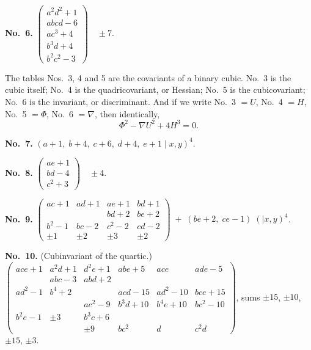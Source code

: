\documentclass[11pt]{article}
\begin{document}
\medskip
\noindent\textbf{No.~6.} \quad
$\begin{pmatrix}
a^2 d^2 + 1 \\
abcd - 6 \\
ac^3 + 4 \\
b^3 d + 4 \\
b^2 c^2 - 3
\end{pmatrix}\quad \pm 7$.

\medskip
The tables Nos.~3, 4 and 5 are the covariants of a binary cubic. No.~3 is the cubic itself; No.~4 is the quadricovariant, or Hessian; No.~5 is the cubicovariant; No.~6 is the invariant, or discriminant. And if we write No.~3 $=U$, No.~4 $=H$, No.~5 $=\Phi$, No.~6 $=\nabla$, then identically,
\[
\Phi^2 - \nabla U^2 + 4 H^3 = 0.
\]

\medskip
\noindent\textbf{No.~7.} \quad $(a+1,\; b+4,\; c+6,\; d+4,\; e+1 \mid x, y)^4$.

\medskip
\noindent\textbf{No.~8.} \quad
$\begin{pmatrix} ae + 1 \\ bd - 4 \\ c^2 + 3 \end{pmatrix}\quad \pm 4$.

\medskip
\noindent\textbf{No.~9.} \quad
$\left(\begin{array}{cccc}
ac + 1 & ad + 1 & ae + 1 & bd + 1 \\
       &        & bd + 2 & be + 2 \\
b^2 - 1 & bc - 2 & c^2 - 2 & cd - 2 \\
\pm 1   & \pm 2  & \pm 3   & \pm 2
\end{array}\right)\;+\;(be + 2,\; ce - 1)\;(\mid x, y)^4$.

\medskip
\noindent\textbf{No.~10.} \quad (Cubinvariant of the quartic.)
$\left(\begin{array}{cccccc}
ace + 1 & a^2 d + 1 & d^2 e + 1 & abe + 5 & ace & ade - 5 \\
        & abc - 3   & abd + 2   &         &     &         \\
ad^2 - 1 & b^4 + 2  &           & acd - 15 & ad^2 - 10 & bce + 15 \\
         &          & ac^2 - 9 & b^3 d + 10 & b^4 e + 10 & bc^2 - 10 \\
b^2 e - 1 & \pm 3   & b^3 c + 6 &           &           &           \\
          &          & \pm 9   & b c^2  & d           & c^2 d
\end{array}\right)$, sums $\pm 15$, $\pm 10$, $\pm 15$, $\pm 3$.
\end{document}
